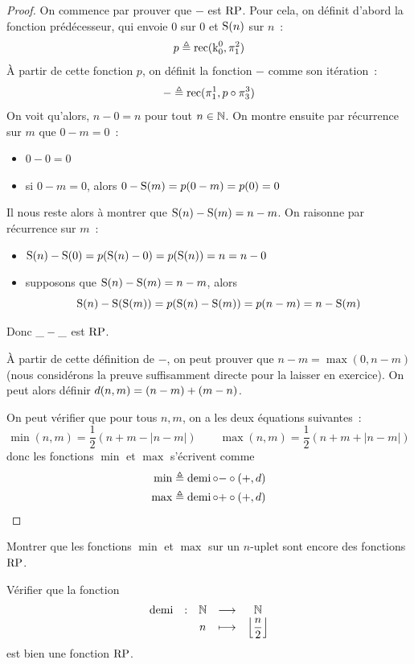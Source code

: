 \begin{proof}
  On commence par prouver que $-$ est $\operatorname{RP}$. Pour cela, on définit d'abord la
  fonction prédécesseur, qui envoie $0$ sur $0$ et $\operatorname{S}(n)$ sur $n$~:
  \[p \triangleq \operatorname{rec}(\operatorname{k}_{0}^{0},\mathop{\pi_{1}^{2}})\]
  \`A partir de cette fonction $p$, on définit la fonction $-$ comme son
  itération~:
  \[\mathord{-} \triangleq \operatorname{rec}(\mathop{\pi_{1}^{1}},p \circ \mathop{\pi_{3}^{3}})\]
  On voit qu'alors, $n - 0 = n$ pour tout $n \in \mathbb N$. On montre ensuite par
  récurrence sur $m$ que $0 - m = 0$~:
  \begin{itemize}
  \item $0 - 0 = 0$
  \item si $0 - m = 0$, alors $0 - \operatorname{S}(m) = p(0-m) = p(0) = 0$
  \end{itemize}
  Il nous reste alors à montrer que $\operatorname{S}(n) - \operatorname{S}(m) = n - m$. On raisonne
  par récurrence sur $m$~:
  \begin{itemize}
  \item $\operatorname{S}(n) - \operatorname{S}(0) = p(\operatorname{S}(n) - 0) = p(\operatorname{S}(n)) = n = n - 0$
  \item supposons que $\operatorname{S}(n) - \operatorname{S}(m) = n - m$, alors
    \[
    \operatorname{S}(n) - \operatorname{S}(\operatorname{S}(m)) = p(\operatorname{S}(n) - \operatorname{S}(m)) = p(n - m) = n - \operatorname{S}(m)
    \]
  \end{itemize}
  Donc $\mathord{\_}-\mathord{\_}$ est $\operatorname{RP}$.

  \`A partir de cette définition de $-$, on peut prouver que $n-m = \max(0,n-m)$
  (nous considérons la preuve suffisamment directe pour la laisser en
  exercice). On peut alors définir $d(n,m) = (n - m) + (m - n)$.

  On peut vérifier que pour tous $n,m$, on a les deux équations suivantes~:
  \[\min(n,m) = \frac{1}{2}(n + m - |n - m|)\qquad
  \max(n,m) = \frac{1}{2}(n + m + |n - m|)\]
  donc les fonctions $\min$ et $\max$ s'écrivent comme
  \begin{align*}
    \min &\triangleq \operatorname{demi}\circ \mathord{-} \circ (+,d)\\
    \max &\triangleq \operatorname{demi}\circ \mathord{+} \circ (+,d)\qedhere
  \end{align*}
\end{proof}

\begin{exercise}
  Montrer que les fonctions $\min$ et $\max$ sur un $n$-uplet sont encore des
  fonctions $\operatorname{RP}$.
\end{exercise}

\begin{exercise}
  Vérifier que la fonction
  \[\makeFun{\demi}{\bN}{\bN}{n}{\left\lfloor\dfrac{n}{2}\right\rfloor}\]
  est bien une fonction $\operatorname{RP}$.
\end{exercise}


